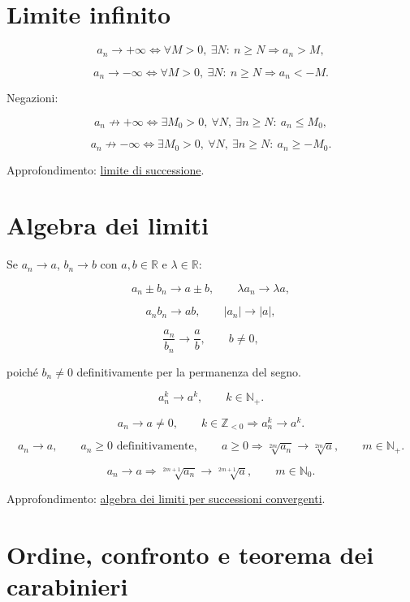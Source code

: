 \section{Limite infinito}\label{limite-infinito}

\[
a_n\to+\infty
\Longleftrightarrow
\forall M>0,\ \exists N:\ n\ge N\Rightarrow a_n>M,
\]

\[
a_n\to-\infty
\Longleftrightarrow
\forall M>0,\ \exists N:\ n\ge N\Rightarrow a_n<-M.
\]

Negazioni:

\[
a_n\not\to+\infty
\Longleftrightarrow
\exists M_0>0,\ \forall N,\ \exists n\ge N:\ a_n\le M_0,
\]

\[
a_n\not\to-\infty
\Longleftrightarrow
\exists M_0>0,\ \forall N,\ \exists n\ge N:\ a_n\ge-M_0.
\]

Approfondimento: \href{https://ingegnerismo.it/matematica/limite-di-successione/}{limite di successione}.

\section{Algebra dei limiti}\label{algebra-dei-limiti}

Se \(a_n\to a\), \(b_n\to b\) con \(a,b\in\mathbb R\) e \(\lambda\in\mathbb R\):

\[
a_n\pm b_n\to a\pm b,
\qquad
\lambda a_n\to\lambda a,
\]

\[
a_nb_n\to ab,
\qquad
|a_n|\to|a|,
\]

\[
\frac{a_n}{b_n}\to\frac ab,
\qquad
b\ne0,
\]

poiché \(b_n\ne0\) definitivamente per la permanenza del segno.

\[
a_n^k\to a^k,
\qquad k\in\mathbb N_+.
\]

\[
a_n\to a\ne0,
\qquad
k\in\mathbb Z_{<0}
\Longrightarrow
a_n^k\to a^k.
\]

\[
a_n\to a,
\qquad
a_n\ge0\text{ definitivamente},
\qquad
a\ge0
\Longrightarrow
\sqrt[2m]{a_n}\to\sqrt[2m]{a},
\qquad m\in\mathbb N_+.
\]

\[
a_n\to a
\Longrightarrow
\sqrt[2m+1]{a_n}\to\sqrt[2m+1]{a},
\qquad m\in\mathbb N_0.
\]

Approfondimento: \href{https://ingegnerismo.it/matematica/algebra-dei-limiti-per-successioni-convergenti/}{algebra dei limiti per successioni convergenti}.

\section{Ordine, confronto e teorema dei carabinieri}\label{ordine-confronto-e-teorema-dei-carabinieri}


